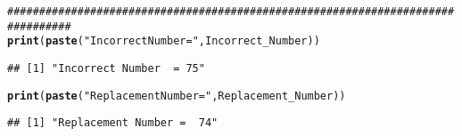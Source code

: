 \documentclass{article}\usepackage[]{graphicx}\usepackage[]{xcolor}
\makeatletter
\newcommand{\hlsng}[1]{\textcolor[rgb]{0.192,0.494,0.8}{#1}}%
\newcommand{\hlcom}[1]{\textcolor[rgb]{0.678,0.584,0.686}{\textit{#1}}}%
\newcommand{\hldef}[1]{\textcolor[rgb]{0.345,0.345,0.345}{#1}}%
\newcommand{\hlkwd}[1]{\textcolor[rgb]{0.737,0.353,0.396}{\textbf{#1}}}%
\newenvironment{kframe}{%
 \def\at@end@of@kframe{}%
 \ifinner\ifhmode%
  \def\at@end@of@kframe{\end{minipage}}%
  \begin{minipage}{\columnwidth}%
 \fi\fi%
 \def\FrameCommand##1{\hskip\@totalleftmargin \hskip-\fboxsep
 \colorbox{shadecolor}{##1}\hskip-\fboxsep
     \hskip-\linewidth \hskip-\@totalleftmargin \hskip\columnwidth}%
 \MakeFramed {\advance\hsize-\width
   \@totalleftmargin\z@ \linewidth\hsize
   \@setminipage}}%
 {\par\unskip\endMakeFramed%
 \at@end@of@kframe}
\newenvironment{knitrout}{}{} %
\makeatother
\begin{document}
\begin{enumerate}
\begin{knitrout}
\begin{kframe}
\begin{alltt}
\hlcom{################################################################################}
\hlkwd{print}\hldef{(}\hlkwd{paste}\hldef{(}\hlsng{"Incorrect Number  ="} \hldef{, Incorrect_Number))}
\end{alltt}
\begin{verbatim}
## [1] "Incorrect Number  = 75"
\end{verbatim}
\begin{alltt}
\hlkwd{print}\hldef{(}\hlkwd{paste}\hldef{(}\hlsng{"Replacement Number = "}\hldef{, Replacement_Number))}
\end{alltt}
\begin{verbatim}
## [1] "Replacement Number =  74"
\end{verbatim}
\end{kframe}
\end{knitrout}

\end{enumerate}


\end{document}
